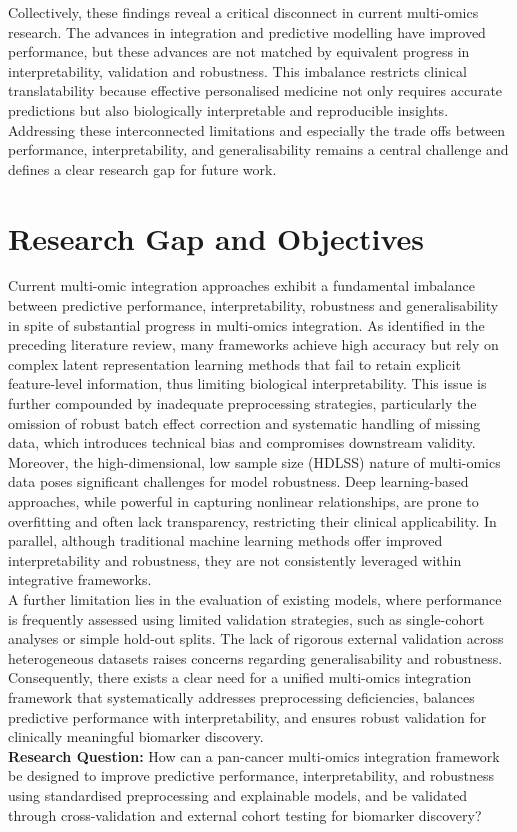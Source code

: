 \documentclass[conference]{IEEEtran}
\begin{document}
Collectively, these findings reveal a critical disconnect in
current multi-omics research. The advances in integration
and predictive modelling have improved performance, but these advances are not matched by equivalent progress in interpretability, validation and robustness. This imbalance restricts clinical translatability because effective personalised medicine not only requires accurate predictions but also biologically interpretable and reproducible insights. Addressing these interconnected limitations and especially the trade offs between performance, interpretability, and generalisability remains a central challenge
and defines a clear research gap for future work.


\section {Research Gap and Objectives}
Current multi-omic integration approaches exhibit a fundamental imbalance between predictive performance, interpretability, robustness and generalisability in spite of substantial progress in multi-omics integration. As identified in the preceding literature review, many frameworks achieve high accuracy but rely on complex latent representation learning methods that fail to retain explicit feature-level information, thus limiting biological interpretability. This issue is further compounded by inadequate preprocessing strategies, particularly the omission of robust batch effect correction and systematic handling of missing data, which introduces technical bias and compromises downstream validity.\\
Moreover, the high-dimensional, low sample size (HDLSS) nature of multi-omics data poses significant challenges for model robustness. Deep learning-based approaches, while powerful in capturing nonlinear relationships, are prone to overfitting and often lack transparency, restricting their clinical applicability. In parallel, although traditional machine learning methods offer improved interpretability and robustness, they are not consistently leveraged within integrative frameworks.\\
A further limitation lies in the evaluation of existing models, where performance is frequently assessed using limited validation strategies, such as single-cohort analyses or simple hold-out splits. The lack of rigorous external validation across heterogeneous datasets raises concerns regarding generalisability and robustness. Consequently, there exists a clear need for a unified multi-omics integration framework that systematically addresses preprocessing deficiencies, balances predictive performance with interpretability, and ensures robust validation for clinically meaningful biomarker discovery.\\
\textbf{Research Question:} 
How can a pan-cancer multi-omics integration framework be designed to improve predictive performance, interpretability, and robustness using standardised preprocessing and explainable models, and be validated through cross-validation and external cohort testing for biomarker discovery?
\end{document}
